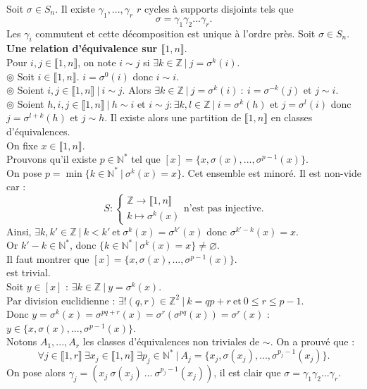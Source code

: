 \documentclass[11pt]{article}
\newcommand*{\Z}{\mathbb{Z}}
\newcommand*{\N}{\mathbb{N}}
\newcommand*{\lb}{\llbracket}
\newcommand*{\rb}{\rrbracket}
\newcommand*{\n}{\\[0.2cm]}
\newcommand{\0}{\varnothing}
\newcommand*{\g}{\gamma}
\newcommand*{\s}{\sigma}
\begin{document}
\begin{thm}{}{}
    Soit $\s\in S_n$. Il existe $\g_1,...,\g_r$ $r$ cycles à supports disjoints tels que
    \begin{equation*}
        \s=\g_1\g_2...\g_r.
    \end{equation*}
    Les $\g_i$ commutent et cette décomposition est unique à l'ordre près.
    \tcblower
    Soit $\s\in S_n$.\\
    \textbf{Une relation d'équivalence sur $\lb1,n\rb$}.\\
    Pour $i,j\in\lb1,n\rb$, on note $i\sim j$ si $\exists k \in \Z ~ | ~ j = \s^k(i)$.\\
    $\circledcirc$ Soit $i\in\lb1,n\rb$. $i=\s^0(i)$ donc $i \sim i$.\\
    $\circledcirc$ Soient $i,j\in\lb1,n\rb ~ | ~ i \sim j$. Alors $\exists k \in \Z ~ | ~ j = \s^k(i) ~ : ~ i = \s^{-k}(j)$ et $j \sim i$.\\
    $\circledcirc$ Soient $h,i,j\in\lb1,n\rb ~ | ~ h \sim i$ et $i \sim j : \exists k,l \in \Z ~ | ~ i = \s^k(h)$ et $j=\s^l(i)$ donc $j=\s^{l+k}(h)$ et $j \sim h$.
    Il existe alors une partition de $\lb1,n\rb$ en classes d'équivalences.\n
    On fixe $x\in\lb1,n\rb$.\\
    Prouvons qu'il existe $p\in\N^*$ tel que $[x]=\{x,\s(x),...,\s^{p-1}(x)\}$.\\
    On pose $p=\min\{k\in\N^* ~ | ~ \s^k(x)=x\}$. Cet ensemble est minoré. Il est non-vide car :
    \begin{equation*}
        S : \begin{cases}
            \Z \to \lb1,n\rb\\
            k\mapsto \s^k(x)
        \end{cases}
        \text{n'est pas injective.}
    \end{equation*}
    Ainsi, $\exists k,k' \in \Z ~ | ~ k < k' ~ \text{et} ~ \s^k(x)=\s^{k'}(x)$ donc $\s^{k'-k}(x)=x$.\\
    Or $k'-k\in\N^*$, donc $\{k\in\N^* ~ | ~ \s^k(x)=x\}\neq\0$.\\
    Il faut montrer que $[x]=\{x,\s(x),...,\s^{p-1}(x)\}$.\\
    \fbox{$\supset$} est trivial.\\
    \fbox{$\subset$} Soit $y\in[x]$ : $\exists k \in \Z ~ | ~ y = \s^k(x)$.\\
    Par division euclidienne : $\exists!(q,r)\in\Z^2 ~ | ~ k = qp + r ~ \text{et} ~ 0 \leq r \leq p-1$.\\
    Donc $y = \s^k(x) = \s^{pq+r}(x) = \s^r(\s^{pq}(x))=\s^r(x)$ : $y\in\{x,\s(x),...,\s^{p-1}(x)\}$.\n
    Notons $A_1,...,A_r$ les classes d'équivalences non triviales de $\sim$. On a prouvé que :
    \begin{equation*}
        \forall j \in \lb1,r\rb ~ \exists x_j \in \lb 1, n \rb ~ \exists p_j \in \N^* ~ | ~ A_j = \{x_j, \s(x_j), ..., \s^{p_j-1}(x_j)\}.
    \end{equation*}
    On pose alors $\g_j=(x_j~\s(x_j)~...~\s^{p_j-1}(x_j))$, il est clair que $\s=\g_1\g_2...\g_r$.
\end{thm}
\end{document}
